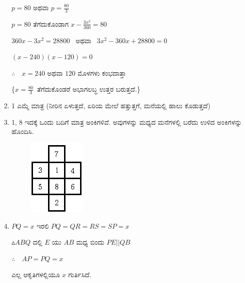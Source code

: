 \begin{enumerate}
$p = 80$ ಅಥವಾ $p = \frac{80}{3}$

$p = 80$ ತೆಗೆದುಕೊಂಡಾಗ $x - \frac{3x^{2}}{360} = 80$

$360x - 3x^{2} = 28800$ \ ಅಥವಾ \ $3x^{2} - 360x + 28800 = 0$

$(x - 240) (x - 120) = 0$

$\therefore\quad x = 240$ ಅಥವಾ $120$ ಮೊಳಗಳು ಕಂಭದಾತ್ತಾ 

\{$x = \frac{80}{3}$\ ತೆಗೆದುಕೊಂಡರೆ ಅಭಾಗಲಬ್ಧ ಉತ್ತರ ಬರುತ್ತದೆ.\}

\item 1 ಎಮ್ಮೆ ಮಾತ್ರ (ನೀರಿನ ಏಳುತ್ತದೆ, ಏರಿಯ ಮೇಲೆ ಹತ್ತುತ್ತಗೆ, ಮನೆಯಲ್ಲಿ ಹಾಲು ಕೊಡುತ್ತದೆ)

\item 1, 8 ಇದಕ್ಕೆ ಒಂದು ಬದಿಗೆ ಮಾತ್ರ ಅಂಕಿಗಳಿವೆ. ಅವುಗಳನ್ನು ಮಧ್ಯದ ಮನೆಗಳಲ್ಲಿ ಬರೆದು ಉಳಿದ ಅಂಕಿಗಳನ್ನು ಹೊಂದಿಸಿ. 

\begin{figure}[H]
\centering
\includegraphics{images/chap3/ans28.eps}
\end{figure}

\item $PQ = x$ ಇರಲಿ  $PQ = QR = RS = SP = x$

$\vartriangle ABQ$ ದಲ್ಲಿ  $E$ ಯು $AB$ ಮಧ್ಯ ಬಿಂದು $PE ||  QB$

$\therefore\quad AP = PQ = x$

ಎಲ್ಲ ಆಕೃತಿಗಳಲ್ಲಿಯೂ $x$ ಗುರ್ತಿಸಿದೆ.  


\end{enumerate}
